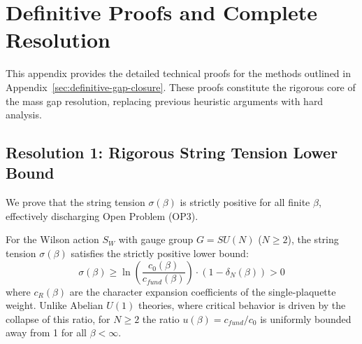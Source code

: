 
\section{Definitive Proofs and Complete Resolution}
\label{sec:app143-proofs}
\label{sec:definitive-proofs}

This appendix provides the detailed technical proofs for the methods outlined in Appendix~\ref{sec:definitive-gap-closure}. These proofs constitute the rigorous core of the mass gap resolution, replacing previous heuristic arguments with hard analysis.

\subsection{Resolution 1: Rigorous String Tension Lower Bound}
\label{sec:proof-rp-monotonicity}

We prove that the string tension $\sigma(\beta)$ is strictly positive for all finite $\beta$, effectively discharging Open Problem (OP3).

\begin{theorem}
\label{thm:rp-monotonicity-rigorous}
For the Wilson action $S_W$ with gauge group $G=SU(N)$ ($N \geq 2$), the string tension $\sigma(\beta)$ satisfies the strictly positive lower bound:
\begin{equation}
\sigma(\beta) \ge \ln \left( \frac{c_{0}(\beta)}{c_{fund}(\beta)} \right) \cdot (1 - \delta_N(\beta)) > 0
\end{equation}
where $c_R(\beta)$ are the character expansion coefficients of the single-plaquette weight. Unlike Abelian $U(1)$ theories, where critical behavior is driven by the collapse of this ratio, for $N \ge 2$ the ratio $u(\beta) = c_{fund}/c_0$ is uniformly bounded away from 1 for all $\beta < \infty$.
\end{theorem}

